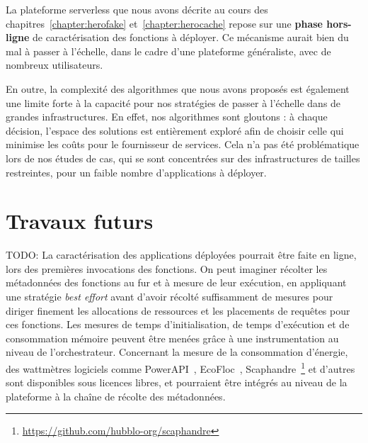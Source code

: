 La plateforme serverless que nous avons décrite au cours des chapitres~\ref{chapter:herofake} et~\ref{chapter:herocache} repose sur une \textbf{phase hors-ligne} de caractérisation des fonctions à déployer. Ce mécanisme aurait bien du mal à passer à l'échelle, dans le cadre d'une plateforme généraliste, avec de nombreux utilisateurs.

En outre, la complexité des algorithmes que nous avons proposés est également une limite forte à la capacité pour nos stratégies de passer à l'échelle dans de grandes infrastructures. En effet, nos algorithmes sont gloutons : à chaque décision, l'espace des solutions est entièrement exploré afin de choisir celle qui minimise les coûts pour le fournisseur de services. Cela n'a pas été problématique lors de nos études de cas, qui se sont concentrées sur des infrastructures de tailles restreintes, pour un faible nombre d'applications à déployer.

\section{Travaux futurs}
\label{section:conclusion-perspectives}


TODO: La caractérisation des applications déployées pourrait être faite en ligne, lors des premières invocations des fonctions. On peut imaginer récolter les métadonnées des fonctions au fur et à mesure de leur exécution, en appliquant une stratégie \textit{best effort} avant d'avoir récolté suffisamment de mesures pour diriger finement les allocations de ressources et les placements de requêtes pour ces fonctions. Les mesures de temps d'initialisation, de temps d'exécution et de consommation mémoire peuvent être menées grâce à une instrumentation au niveau de l'orchestrateur. Concernant la mesure de la consommation d'énergie, des wattmètres logiciels comme PowerAPI~\cite{fieniPowerAPIPythonFramework2024}, EcoFloc~\cite{valeraEnergySavingPerspective}, Scaphandre~\footnote{\href{https://github.com/hubblo-org/scaphandre}{https://github.com/hubblo-org/scaphandre}} et d'autres~\cite{jayExperimentalComparisonSoftwarebased2023} sont disponibles sous licences libres, et pourraient être intégrés au niveau de la plateforme à la chaîne de récolte des métadonnées.

